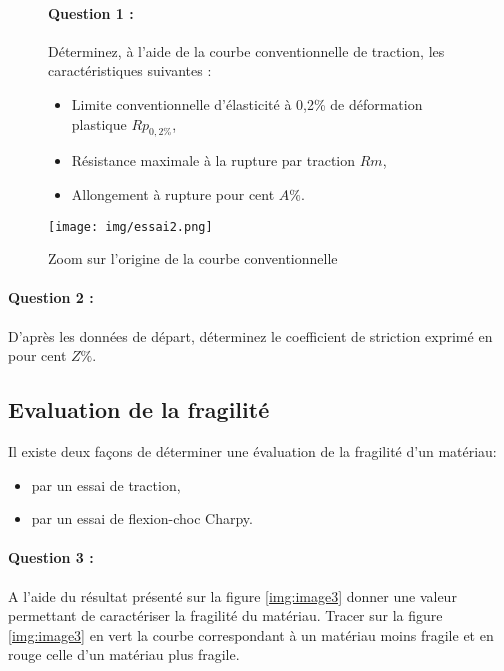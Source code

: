  
 \begin{figure}[!h]
 \begin{minipage}{0.4\linewidth}
\paragraph{Question 1 :} Déterminez, à l'aide de la courbe conventionnelle de traction, les caractéristiques suivantes :
\begin{itemize}
 \item Limite conventionnelle d'élasticité à 0,2\% de déformation plastique $Rp_{0,2\%}$,
 \item Résistance maximale à la rupture par traction $Rm$,
 \item Allongement à rupture pour cent $A\%$.
\end{itemize}
 \end{minipage}
\hfill
 \begin{minipage}{0.59\linewidth}
  \centering\texttt{[image: img/essai2.png]}
  \caption{Zoom sur l'origine de la courbe conventionnelle}
  \label{img:image4}
 \end{minipage}
\end{figure}

\paragraph{Question 2 :} D'après les données de départ, déterminez le coefficient de striction exprimé en pour cent $Z\%$.

\subsection{Evaluation de la fragilité}

Il existe deux façons de déterminer une évaluation de la fragilité d'un matériau:
\begin{itemize}
 \item par un essai de traction,
 \item par un essai de flexion-choc Charpy.
\end{itemize}

\paragraph{Question 3 :} A l'aide du résultat présenté sur la figure \ref{img:image3} donner une valeur permettant de caractériser la fragilité du matériau. Tracer sur la figure \ref{img:image3} en vert la courbe correspondant à un matériau moins fragile et en rouge celle d'un matériau plus fragile.

